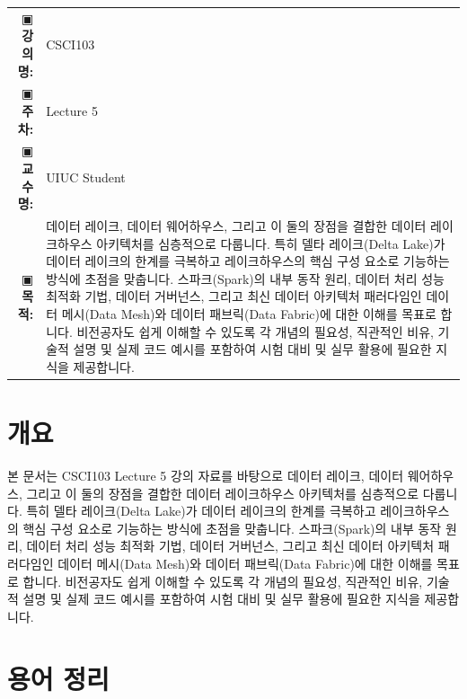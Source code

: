 \documentclass[11pt,a4paper]{article}
\makeatletter
\theoremstyle{definition}
\newcommand{\metainfo}[4]{
\begin{tcolorbox}[
    colback=lightpurple,
    colframe=darkpurple,
    boxrule=1pt,
    arc=2mm,
    left=10pt,
    right=10pt,
    top=8pt,
    bottom=8pt
]
\begin{tabular}{@{}rl@{}}
▣ \textbf{강의명:} & #1 \\[0.3em]
▣ \textbf{주차:} & #2 \\[0.3em]
▣ \textbf{교수명:} & #3 \\[0.3em]
▣ \textbf{목적:} & \begin{minipage}[t]{0.75\textwidth}#4\end{minipage}
\end{tabular}
\end{tcolorbox}
}
\makeatother
\begin{document}
\thispagestyle{firstpage}

\metainfo{CSCI103}{Lecture 5}{UIUC Student}{데이터 레이크, 데이터 웨어하우스, 그리고 이 둘의 장점을 결합한 데이터 레이크하우스 아키텍처를 심층적으로 다룹니다. 특히 델타 레이크(Delta Lake)가 데이터 레이크의 한계를 극복하고 레이크하우스의 핵심 구성 요소로 기능하는 방식에 초점을 맞춥니다. 스파크(Spark)의 내부 동작 원리, 데이터 처리 성능 최적화 기법, 데이터 거버넌스, 그리고 최신 데이터 아키텍처 패러다임인 데이터 메시(Data Mesh)와 데이터 패브릭(Data Fabric)에 대한 이해를 목표로 합니다. 비전공자도 쉽게 이해할 수 있도록 각 개념의 필요성, 직관적인 비유, 기술적 설명 및 실제 코드 예시를 포함하여 시험 대비 및 실무 활용에 필요한 지식을 제공합니다.}

\tableofcontents

\newpage

\section{개요}
본 문서는 CSCI103 Lecture 5 강의 자료를 바탕으로 데이터 레이크, 데이터 웨어하우스, 그리고 이 둘의 장점을 결합한 데이터 레이크하우스 아키텍처를 심층적으로 다룹니다. 특히 델타 레이크(Delta Lake)가 데이터 레이크의 한계를 극복하고 레이크하우스의 핵심 구성 요소로 기능하는 방식에 초점을 맞춥니다. 스파크(Spark)의 내부 동작 원리, 데이터 처리 성능 최적화 기법, 데이터 거버넌스, 그리고 최신 데이터 아키텍처 패러다임인 데이터 메시(Data Mesh)와 데이터 패브릭(Data Fabric)에 대한 이해를 목표로 합니다. 비전공자도 쉽게 이해할 수 있도록 각 개념의 필요성, 직관적인 비유, 기술적 설명 및 실제 코드 예시를 포함하여 시험 대비 및 실무 활용에 필요한 지식을 제공합니다.

\section{용어 정리}
\end{document}
